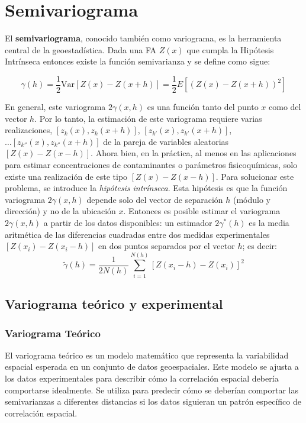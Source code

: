 \section{	Semivariograma}

El \textbf{semivariograma}, conocido también como variograma, es la herramienta central de la geoestadística. Dada una FA \( Z(x) \) que cumpla la Hipótesis Intrínseca entonces existe la función semivarianza y se define como sigue:

\[
\gamma(h) = \frac{1}{2} \text{Var} [Z(x) - Z(x+h)] = \frac{1}{2} E \left[ \left( Z(x) - Z(x+h) \right)^2 \right]
\]

En general, este variograma \( 2\gamma(x,h) \) es una función tanto del punto \( x \) como del vector \( h \). Por lo tanto, la estimación de este variograma requiere varias realizaciones, \([z_k (x),z_k (x+h)]\), \([z_{k'} (x),z_{k'} (x+h)]\), \(\ldots [z_{k''} (x),z_{k''} (x+h)]\) de la pareja de variables aleatorias \([Z(x)-Z(x-h)]\). Ahora bien, en la práctica, al menos en las aplicaciones para estimar concentraciones de contaminantes o parámetros fisicoquímicas, solo existe una realización de este tipo \([Z(x)-Z(x-h)]\). Para solucionar este problema, se introduce la \textit{hipótesis intrínseca}. Esta hipótesis es que la función variograma \( 2\gamma(x,h) \) depende solo del vector de separación \( h \) (módulo y dirección) y no de la ubicación \( x \). Entonces es posible estimar el variograma \( 2\gamma(x,h) \) a partir de los datos disponibles: un estimador \( 2\gamma^*(h) \) es la media aritmética de las diferencias cuadradas entre dos medidas experimentales \([Z(x_i )-Z(x_i-h)]\) en dos puntos separados por el vector \( h \); es decir:
\[
\tilde{\gamma}(h) = \frac{1}{2N(h)} \sum_{i=1}^{N(h)} [Z(x_i-h)-Z(x_i)]^2
\]
\subsection{	Variograma teórico y experimental}

\subsubsection*{Variograma Teórico}

El variograma teórico es un modelo matemático que representa la variabilidad espacial esperada en un conjunto de datos geoespaciales. Este modelo se ajusta a los datos experimentales para describir cómo la correlación espacial debería comportarse idealmente. Se utiliza para predecir cómo se deberían comportar las semivarianzas a diferentes distancias si los datos siguieran un patrón específico de correlación espacial.

